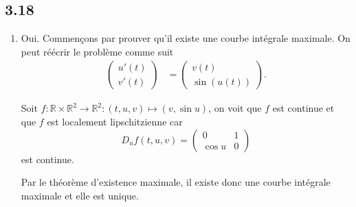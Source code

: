 \documentclass[fontsize=12pt]{article}
\begin{document}
\subsection*{3.18}
\begin{enumerate}
  \item Oui. Commençons par prouver qu'il existe une courbe intégrale maximale.
    On peut réécrir le problème comme suit
    \begin{align*}
      \begin{pmatrix}
        u'(t)\\
        v'(t)
      \end{pmatrix} & =
      \begin{pmatrix}
        v(t)\\
        \sin(u(t))
      \end{pmatrix}.
    \end{align*}

    Soit $f:\mathbb{R}\times\mathbb{R}^2\to\mathbb{R}^2:
    (t,u,v)\mapsto(v,\sin u)$, on voit que $f$ est continue et que
    $f$ est localement lipschitzienne car
    \[ D_uf(t,u,v) =
    \begin{pmatrix}
      0 & 1\\
      \cos u & 0
    \end{pmatrix} \]
    est continue.

    Par le théorème d'existence maximale, il existe donc une courbe intégrale
    maximale et elle est unique.


\end{enumerate}
\end{document}
